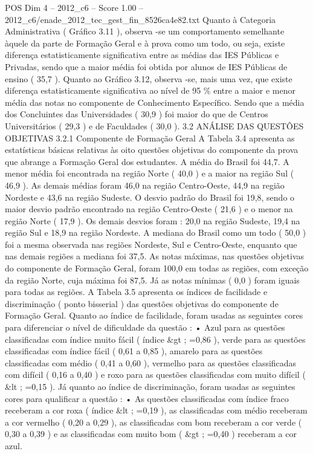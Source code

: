 \begin{textsample}{POS Dim 4 – 2012\_c6 – Score 1.00 – 2012\_c6/enade\_2012\_tec\_gest\_fin\_8526ca4e82.txt}
Quanto à Categoria Administrativa ( Gráfico 3.11 ), observa -se um comportamento semelhante àquele da parte de Formação Geral e à prova como um todo, ou seja, existe diferença estatisticamente significativa entre as médias das IES Públicas e Privadas, sendo que a maior média foi obtida por alunos de IES Públicas de ensino ( 35,7 ).
Quanto ao Gráfico 3.12, observa -se, mais uma vez, que existe diferença estatisticamente significativa ao nível de 95 \% entre a maior e menor média das notas no componente de Conhecimento Específico.
Sendo que a média dos Concluintes das Universidades ( 30,9 ) foi maior do que de Centros Universitários ( 29,3 ) e de Faculdades ( 30,0 ). 3.2 ANÁLISE DAS QUESTÕES OBJETIVAS 3.2.1 Componente de Formação Geral A Tabela 3.4 apresenta as estatísticas básicas relativas às oito questões objetivas do componente da prova que abrange a Formação Geral dos estudantes.
A média do Brasil foi 44,7.
A menor média foi encontrada na região Norte ( 40,0 ) e a maior na região Sul ( 46,9 ).
As demais médias foram 46,0 na região Centro-Oeste, 44,9 na região Nordeste e 43,6 na região Sudeste.
O desvio padrão do Brasil foi 19,8, sendo o maior desvio padrão encontrado na região Centro-Oeste ( 21,6 ) e o menor na região Norte ( 17,9 ).
Os demais desvios foram : 20,0 na região Sudeste, 19,4 na região Sul e 18,9 na região Nordeste.
A mediana do Brasil como um todo ( 50,0 ) foi a mesma observada nas regiões Nordeste, Sul e Centro-Oeste, enquanto que nas demais regiões a mediana foi 37,5.
As notas máximas, nas questões objetivas do componente de Formação Geral, foram 100,0 em todas as regiões, com exceção da região Norte, cuja máxima foi 87,5.
Já as notas mínimas ( 0,0 ) foram iguais para todas as regiões.
A Tabela 3.5 apresenta os índices de facilidade e discriminação ( ponto bisserial ) das questões objetivas do componente de Formação Geral.
Quanto ao índice de facilidade, foram usadas as seguintes cores para diferenciar o nível de dificuldade da questão : • Azul para as questões classificadas com índice muito fácil ( índice \&gt ; =0,86 ), verde para as questões classificadas com índice fácil ( 0,61 a 0,85 ), amarelo para as questões classificadas com médio ( 0,41 a 0,60 ), vermelho para as questões classificadas com difícil ( 0,16 a 0,40 ) e roxo para as questões classificadas com muito difícil ( \&lt ; =0,15 ).
Já quanto ao índice de discriminação, foram usadas as seguintes cores para qualificar a questão : • As questões classificadas com índice fraco receberam a cor roxa ( índice \&lt ; =0,19 ), as classificadas com médio receberam a cor vermelho ( 0,20 a 0,29 ), as classificadas com bom receberam a cor verde ( 0,30 a 0,39 ) e as classificadas com muito bom ( \&gt ; =0,40 ) receberam a cor azul.

\end{textsample}
